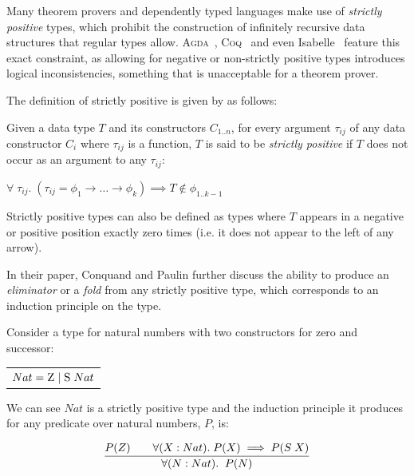 Many theorem provers and dependently typed languages make use of \textit{strictly positive} types, which
prohibit the construction of infinitely recursive data structures that regular types allow.
\textsc{Agda}~\citep{AgdaStrictlyPositive}, \textsc{Coq}~\citep{CoqStrictlyPositive} and even
Isabelle~\citep{IsabelleStrictlyPositive} feature this exact constraint, as allowing for negative
or non-strictly positive types introduces logical inconsistencies, something that is unacceptable for a theorem prover.

The definition of strictly positive is given by \citet{CoquandTypes} as follows:

\theoremstyle{definition}
\begin{definition}
    \label{def:sp}
    Given a data type $T$ and its constructors $C_{1..n}$, for every argument $\tau_{ij}$
    of any data constructor $C_i$ where $\tau_{ij}$ is a function, $T$ is said to be \textit{strictly positive} if 
    $T$ does not occur as an argument to any $\tau_{ij}$:

    \begin{center}
        $\forall\; \tau_{ij}.\;
        (\tau_{ij} = \phi_{1} \rightarrow \dots \rightarrow \phi_{k})
        \implies T \notin \phi_{1..k-1}$
    \end{center}
\end{definition}

Strictly positive types can also be defined as types where $T$ appears in a negative or positive 
position exactly zero times (i.e. it does not appear to the left of any arrow).

In their paper, Conquand and Paulin further discuss the ability to produce an \textit{eliminator} or a
\textit{fold} from any strictly positive type, which corresponds to an induction principle on the type.

Consider a type for natural numbers with two constructors for zero and successor:

\begin{center}
    \begin{tabular}{l}
        $Nat = \textsc{Z}\; \vert\; \textsc{S}\; Nat$ \\
    \end{tabular} 
\end{center}

We can see $Nat$ is a strictly positive type and the induction principle it produces
for any predicate over natural numbers, $P$, is:

\[
    \infer{
        \forall(N : Nat).\;\; P(N)
    }{
        P(Z) \quad & \forall (X : Nat).\; P(X) \implies P(S\; X)
    }
\]

